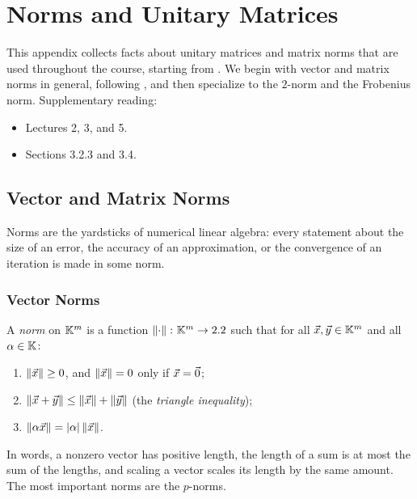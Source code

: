 \chapter{Norms and Unitary Matrices}
\label{app:norms}

This appendix collects facts about unitary matrices and matrix norms that are used throughout the course, starting from . We begin with vector and matrix norms in general, following \cite[Lecture 3]{TB}, and then specialize to the $2$-norm and the Frobenius norm. Supplementary reading:
\begin{itemize}
  \item \cite{TB} Lectures 2, 3, and 5.
  \item \cite{Demmel} Sections 3.2.3 and 3.4.
\end{itemize}

\section{Vector and Matrix Norms}
\label{sec:norms}

Norms are the yardsticks of numerical linear algebra: every statement about the size of an error, the accuracy of an approximation, or the convergence of an iteration is made in some norm.

\subsection{Vector Norms}

\begin{definition}
  \label{def:vector-norm}
  A \emph{norm} on $\mathbb{K}^m$ is a function $\left\lVert \cdot \right\rVert \colon \mathbb{K}^m \to 2.2$ such that for all $\vec{x}, \vec{y} \in \mathbb{K}^m$ and all $\alpha \in \mathbb{K}$:
  \begin{enumerate}
    \item $\left\lVert \vec{x} \right\rVert \ge 0$, and $\left\lVert \vec{x} \right\rVert = 0$ only if $\vec{x} = \vec{0}$;
    \item $\left\lVert \vec{x} + \vec{y} \right\rVert \le \left\lVert \vec{x} \right\rVert + \left\lVert \vec{y} \right\rVert$ (the \emph{triangle inequality});
    \item $\left\lVert \alpha\vec{x} \right\rVert = \left\lvert \alpha \right\rvert\left\lVert \vec{x} \right\rVert$.
  \end{enumerate}
\end{definition}

In words, a nonzero vector has positive length, the length of a sum is at most the sum of the lengths, and scaling a vector scales its length by the same amount. The most important norms are the $p$-norms.

